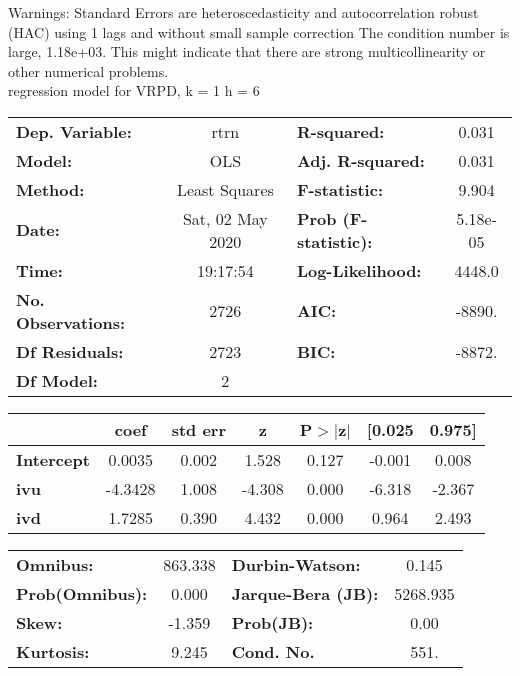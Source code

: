Warnings: \newline
 [1] Standard Errors are heteroscedasticity and autocorrelation robust (HAC) using 1 lags and without small sample correction \newline
 [2] The condition number is large, 1.18e+03. This might indicate that there are \newline
 strong multicollinearity or other numerical problems.\\ 

regression model for VRPD, k = 1 h = 6\begin{center}
\begin{tabular}{lclc}
\toprule
\textbf{Dep. Variable:}    &       rtrn       & \textbf{  R-squared:         } &     0.031   \\
\textbf{Model:}            &       OLS        & \textbf{  Adj. R-squared:    } &     0.031   \\
\textbf{Method:}           &  Least Squares   & \textbf{  F-statistic:       } &     9.904   \\
\textbf{Date:}             & Sat, 02 May 2020 & \textbf{  Prob (F-statistic):} &  5.18e-05   \\
\textbf{Time:}             &     19:17:54     & \textbf{  Log-Likelihood:    } &    4448.0   \\
\textbf{No. Observations:} &        2726      & \textbf{  AIC:               } &    -8890.   \\
\textbf{Df Residuals:}     &        2723      & \textbf{  BIC:               } &    -8872.   \\
\textbf{Df Model:}         &           2      & \textbf{                     } &             \\
\bottomrule
\end{tabular}
\begin{tabular}{lcccccc}
                   & \textbf{coef} & \textbf{std err} & \textbf{z} & \textbf{P$> |$z$|$} & \textbf{[0.025} & \textbf{0.975]}  \\
\midrule
\textbf{Intercept} &       0.0035  &        0.002     &     1.528  &         0.127        &       -0.001    &        0.008     \\
\textbf{ivu}       &      -4.3428  &        1.008     &    -4.308  &         0.000        &       -6.318    &       -2.367     \\
\textbf{ivd}       &       1.7285  &        0.390     &     4.432  &         0.000        &        0.964    &        2.493     \\
\bottomrule
\end{tabular}
\begin{tabular}{lclc}
\textbf{Omnibus:}       & 863.338 & \textbf{  Durbin-Watson:     } &    0.145  \\
\textbf{Prob(Omnibus):} &   0.000 & \textbf{  Jarque-Bera (JB):  } & 5268.935  \\
\textbf{Skew:}          &  -1.359 & \textbf{  Prob(JB):          } &     0.00  \\
\textbf{Kurtosis:}      &   9.245 & \textbf{  Cond. No.          } &     551.  \\
\bottomrule
\end{tabular}
\end{center}

